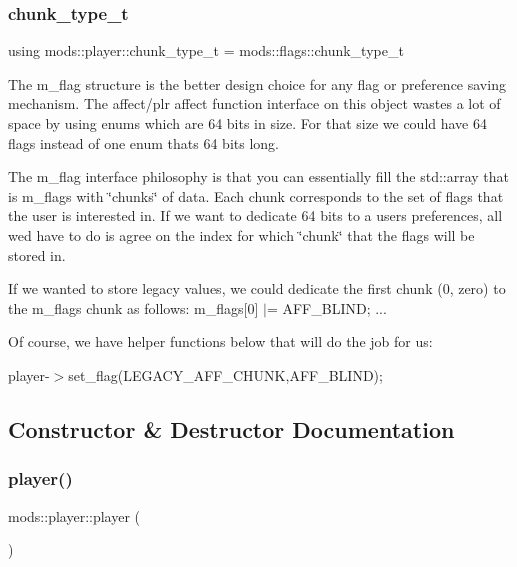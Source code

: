 \subsubsection{\texorpdfstring{chunk\+\_\+type\+\_\+t}{chunk\_type\_t}}
{\footnotesize\ttfamily using mods\+::player\+::chunk\+\_\+type\+\_\+t =  mods\+::flags\+::chunk\+\_\+type\+\_\+t}

The m\+\_\+flag structure is the better design choice for any flag or preference saving mechanism. The affect/plr affect function interface on this object wastes a lot of space by using enums which are 64 bits in size. For that size we could have 64 flags instead of one enum that\textquotesingle{}s 64 bits long.

The m\+\_\+flag interface philosophy is that you can essentially fill the std\+::array that is m\+\_\+flags with \char`\"{}chunks\char`\"{} of data. Each chunk corresponds to the set of flags that the user is interested in. If we want to dedicate 64 bits to a user\textquotesingle{}s preferences, all we\textquotesingle{}d have to do is agree on the index for which \char`\"{}chunk\char`\"{} that the flags will be stored in.

If we wanted to store legacy values, we could dedicate the first chunk (0, zero) to the m\+\_\+flags chunk as follows\+: m\+\_\+flags\mbox{[}0\mbox{]} $\vert$= A\+F\+F\+\_\+\+B\+L\+I\+ND; ...

Of course, we have helper functions below that will do the job for us\+:

player-\/$>$set\+\_\+flag(\+L\+E\+G\+A\+C\+Y\+\_\+\+A\+F\+F\+\_\+\+C\+H\+U\+N\+K,\+A\+F\+F\+\_\+\+B\+L\+I\+N\+D); 

\subsection{Constructor \& Destructor Documentation}
\mbox{\label{classmods_1_1player_ae86efeb0a9121b227ac34b24e0556fed}} 
\subsubsection{\texorpdfstring{player()}{player()}\hspace{0.1cm}{\footnotesize\ttfamily [1/2]}}
{\footnotesize\ttfamily mods\+::player\+::player (\begin{DoxyParamCaption}{ }\end{DoxyParamCaption})}

